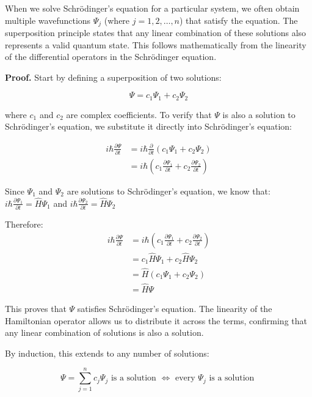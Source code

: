 \documentclass[italian]{HKNdocument}
\begin{document}
When we solve Schrödinger's equation for a particular system, we often obtain multiple wavefunctions $\Psi_{j}$ (where $j=1,2, \ldots, n$) that satisfy the equation. The superposition principle states that any linear combination of these solutions also represents a valid quantum state. This follows mathematically from the linearity of the differential operators in the Schrödinger equation.

\textbf{Proof.} Start by defining a superposition of two solutions:

\begin{equation}
\Psi=c_{1} \Psi_{1}+c_{2} \Psi_{2} \label{eq:1.19}
\end{equation}

where $c_1$ and $c_2$ are complex coefficients. To verify that $\Psi$ is also a solution to Schrödinger's equation, we substitute it directly into Schrödinger's equation:

\begin{align}
i \hbar \frac{\partial \Psi}{\partial t} &= i \hbar \frac{\partial}{\partial t}\left(c_{1} \Psi_{1}+c_{2} \Psi_{2}\right) \\
&= i \hbar\left(c_{1} \frac{\partial \Psi_{1}}{\partial t}+c_{2} \frac{\partial \Psi_{2}}{\partial t}\right) \label{eq:1.20}
\end{align}

Since $\Psi_1$ and $\Psi_2$ are solutions to Schrödinger's equation, we know that:
$i \hbar \frac{\partial \Psi_1}{\partial t} = \hat{H}\Psi_1$ and $i \hbar \frac{\partial \Psi_2}{\partial t} = \hat{H}\Psi_2$

Therefore:
\begin{align}
i \hbar \frac{\partial \Psi}{\partial t} &= i \hbar\left(c_{1} \frac{\partial \Psi_{1}}{\partial t}+c_{2} \frac{\partial \Psi_{2}}{\partial t}\right) \\
&= c_{1} \hat{H} \Psi_{1}+c_{2} \hat{H} \Psi_{2} \\
&= \hat{H}\left(c_{1} \Psi_{1}+c_{2} \Psi_{2}\right) \\
&= \hat{H} \Psi
\end{align}

This proves that $\Psi$ satisfies Schrödinger's equation. The linearity of the Hamiltonian operator allows us to distribute it across the terms, confirming that any linear combination of solutions is also a solution.

By induction, this extends to any number of solutions:

\begin{equation}
\Psi=\sum_{j=1}^{n} c_{j} \Psi_{j} \text{ is a solution } \Longleftrightarrow \text{ every } \Psi_{j} \text{ is a solution } \label{eq:1.21}
\end{equation}
\end{document}
